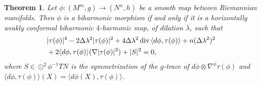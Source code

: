 \documentclass[12pt]{amsart}
\theoremstyle{plain}
\newtheorem{thm}{Theorem}
\theoremstyle{definition}
\begin{document}
\begin{thm} \label{thm1}
Let $\phi : (M^{m},g) \to (N^{n},h)$ be a smooth map between Riemannian manifolds.
Then $\phi$ is a biharmonic morphism {if and only if} it is a {horizontally weakly conformal} biharmonic $4$-harmonic
map, of dilation $\lambda$, such that
\begin{align}\label{longeq}
& |\tau(\phi)|^{4} - 2\Delta \lambda^{2} |\tau(\phi)|^{2} + 4 \Delta \lambda^{2}
\operatorname{div}{\langle d\phi , \tau(\phi)\rangle} + n (\Delta \lambda^{2})^{2} \\
& + 2 \langle d\phi , \tau(\phi) \rangle (\nabla |\tau(\phi)|^{2}) + |S|^{2} = 0 ,\notag
\end{align}
where $S \in \odot^{2} \phi^{-1}TN$ is the symmetrization of the $g$-trace of $d\phi
\otimes \nabla^{\phi} \tau(\phi)$ and $\langle d\phi , \tau(\phi)\rangle (X) = \langle d\phi(X) , \tau(\phi)\rangle$.
\end{thm}
\end{document}
